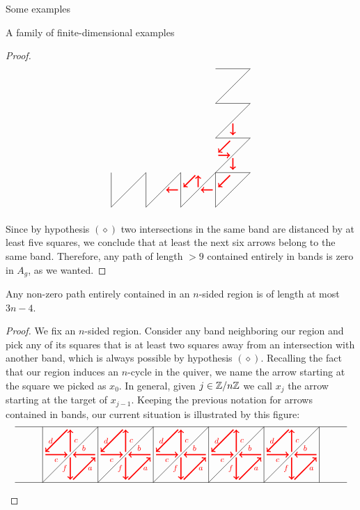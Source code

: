 \begin{chapter}{Some examples}
\begin{section}{A family of finite-dimensional examples}
\begin{proof}
\[\begin{tikzpicture}
\foreach \x in {-3.75,-2.5,...,0}
{
\draw (\x,-1.25) -- (\x+1.25, 0);
\draw (0, -\x) -- (1.25, -\x);
\draw (\x,0) -- (\x, -1.25);
}

\foreach \x in {0,1.25,...,2.5}
\draw (0, \x) -- (1.25, \x+1.25);

\draw[->, red, very thick] (0.5*1.25, 1.5*1.25 - 0.1) -- (0.5*1.25, 1.25 + 0.1);
\draw[->, red, very thick] (0.5*1.25 - 0.1, 1.25-0.1) -- (0.1, 0.5*1.25+0.1);
\draw[->, red, very thick] (0.1, 0.5*1.25) -- (0.5*1.25 - 0.1, 0.5*1.25);
\draw[->, red, very thick] (0.5*1.25, 0.5*1.25-0.1) -- (0.5*1.25, 0.1);
\draw[->, red, very thick] (0.5*1.25 - 0.1, -0.1) -- (0.1, -0.5*1.25+0.1);
\draw[->, red, very thick] (-0.1, -0.5*1.25) -- (-0.5*1.25+0.1, -0.5*1.25);
\draw[->, red, very thick] (-0.5*1.25, -0.5*1.25+0.1) -- (-0.5*1.25, -0.1);
\draw[->, red, very thick] (-0.5*1.25 - 0.1, -0.1) -- (-1.25 + 0.1, -0.5*1.25+0.1);
\draw[->, red, very thick] (-1.25 -0.1, -0.5*1.25) -- (-1.5*1.25+0.1, -0.5*1.25);
\end{tikzpicture}
\]

Since by hypothesis $(\diamond)$ two intersections in the same band are distanced by at least five squares, we conclude that at least the next six arrows belong to the same band. Therefore, any path of length $>9$ contained entirely in bands is zero in $A_g$, as we wanted.
\end{proof}

\begin{lemma}\label{long-region-paths} Any non-zero path entirely contained in an $n$-sided region is of length at most $3n-4$.
\end{lemma}
\begin{proof} We fix an $n$-sided region. Consider any band neighboring our region and pick any of its squares that is at least two squares away from an intersection with another band, which is always possible by hypothesis $(\diamond)$. Recalling the fact that our region induces an $n$-cycle in the quiver, we name the arrow starting at the square we picked as $x_0$. In general, given $j\in \mathbb{Z}/n\mathbb{Z}$ we call $x_j$ the arrow starting at the target of $x_{j-1}$. Keeping the previous notation for arrows contained in bands, our current situation is illustrated by this figure:
\[
\begin{tikzpicture}[text width=1.5mm, font=\footnotesize]
\draw (-6, 0) -- (6, 0);
\draw (-6, 2) -- (6, 2);
\foreach \x in {-5,-3,...,5}
\draw (\x, 0) -- (\x, 2);
\foreach \x in {-5,-3,...,3}
{
\draw (\x,0) -- (\x+2, 2);
\draw [->, red, very thick] (\x+1.9, 1) to node[above] {$b$} (\x+1.1, 1);
\draw[->, red, very thick] (\x+1, 0.9) to node[left]{$f$} (\x+1, 0.1);
\draw[->, red, very thick] (\x+1.1, 0.1) to node[right]{$a$} (\x+1.9, 0.9);
\draw[->, red, very thick] (\x+1, 1.1) to node[right]{$c$} (\x+1, 1.9);
\draw[->, red, very thick] (\x+0.9, 1.9) to node[left]{$d$} (\x+0.1, 1.1);
\draw[->, red, very thick] (\x+0.1, 1) to node[below]{$e$} (\x+0.9, 1);
}


\end{tikzpicture}\]
\end{proof}
\end{section}
\end{chapter}
